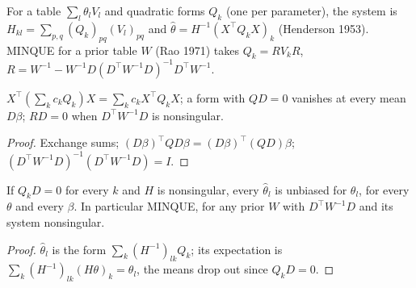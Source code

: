 \begin{definition}\label{def:henderson}
  \leanok
  For a table $\sum_l\theta_lV_l$ and quadratic forms $Q_k$ (one per parameter), the system is
  $H_{kl} = \sum_{p,q}(Q_k)_{pq}(V_l)_{pq}$ and $\hat\theta = H^{-1}(X^\top Q_kX)_k$ (Henderson
  1953). MINQUE for a prior table $W$ (Rao 1971) takes $Q_k = RV_kR$,
  $R = W^{-1} - W^{-1}D(D^\top W^{-1}D)^{-1}D^\top W^{-1}$.
\end{definition}

\begin{lemma}\label{lem:quad_sum}
  \leanok
  $X^\top(\sum_kc_kQ_k)X = \sum_kc_kX^\top Q_kX$; a form with $QD = 0$ vanishes at every mean
  $D\beta$; $RD = 0$ when $D^\top W^{-1}D$ is nonsingular.
\end{lemma}
\begin{proof}
  \leanok
  Exchange sums; $(D\beta)^\top Q D\beta = (D\beta)^\top(QD)\beta$; $(D^\top W^{-1}D)^{-1}(D^\top W^{-1}D) = I$.
\end{proof}

\begin{theorem}\label{thm:henderson_unbiased}
  \leanok
  If $Q_kD = 0$ for every $k$ and $H$ is nonsingular, every $\hat\theta_l$ is unbiased for
  $\theta_l$, for every $\theta$ and every $\beta$. In particular MINQUE, for any prior $W$
  with $D^\top W^{-1}D$ and its system nonsingular.
\end{theorem}
\begin{proof}
  \leanok
  $\hat\theta_l$ is the form $\sum_k(H^{-1})_{lk}Q_k$; its expectation is
  $\sum_k(H^{-1})_{lk}(H\theta)_k = \theta_l$, the means drop out since $Q_kD = 0$.
\end{proof}


